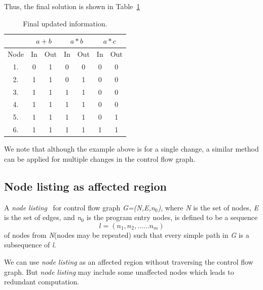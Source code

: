 \documentclass[11pt,a4paper,openright]{report}
\begin{document}
Thus, the final solution is shown in Table~\ref{tab:Available_exp_final_solution}

\begin{table}[H]
  \begin{center}
    \begin{tabular}{c c c c c c c }
    \hline
       & \multicolumn{2}{c}{$a+b$} & \multicolumn{2}{c}{$a*b$} & \multicolumn{2}{c}{$a*c$} \\
    \hline
      Node & In & Out & In & Out & In & Out\\
   	\midrule
   	  1. & 0 & 1 &0 & 0 & 0 & 0 \\
   	  2. & 1 & 1 & 0 & 1 & 0 & 0  \\
   	  3. & 1 & 1 & 1 & 1 & 0 & 0 \\
   	  4. & 1 & 1 & 1 & 1 & 0 & 0 \\
   	  5. & 1 & 1 & 1 & 1& 0 & 1 \\
   	  6. & 1 & 1 & 1 & 1 & 1 & 1\\
      
      \bottomrule 
    \end{tabular}
    \caption{Final updated information.}
      \label{tab:Available_exp_final_solution}
  \end{center}
\end{table}

We note that although the example above is for a single change, a similar method can be applied for multiple changes in the control flow graph.

\subsection{Node listing as affected region}
A \textit{node listing}~\cite{node_listing} for control flow graph \textit{G=(N,E,n$_0$)}, where \textit{N} is the set of nodes, \textit{E} is the set of edges, and \textit{n$_0$} is the
program entry nodes, is defined to be a sequence 
\begin{equation}
 l=(n_1, n_2, ......n_m)
\end{equation}
of nodes from \textit{N}(nodes may be repeated) such that every simple path in \textit{G} is a subsequence of \textit{l}. 

We can use \textit{node listing} as an affected region without traversing the control flow graph.
But \textit{node listing} may include some unaffected nodes which leads to redundant computation.   
\end{document}
